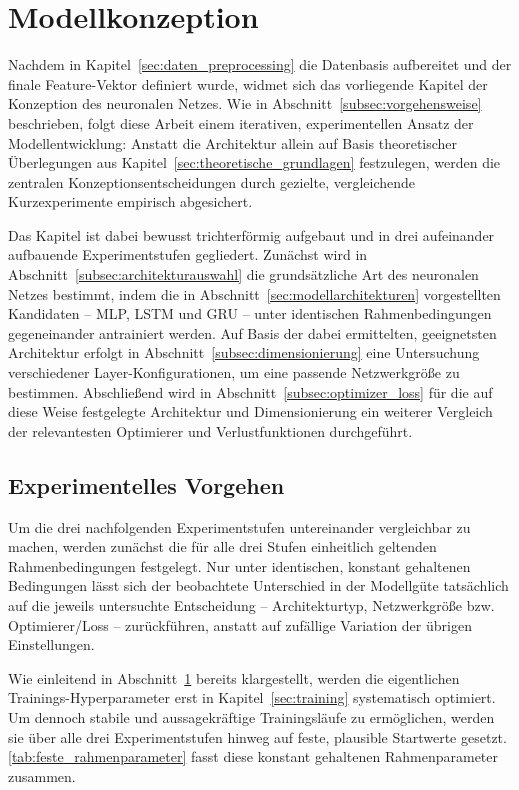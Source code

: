 \section{Modellkonzeption}
\label{sec:konzeption}

Nachdem in Kapitel~\ref{sec:daten_preprocessing} die Datenbasis aufbereitet und der finale Feature-Vektor definiert wurde, widmet sich das vorliegende Kapitel der Konzeption des neuronalen Netzes. Wie in Abschnitt~\ref{subsec:vorgehensweise} beschrieben, folgt diese Arbeit einem iterativen, experimentellen Ansatz der Modellentwicklung: Anstatt die Architektur allein auf Basis theoretischer Überlegungen aus Kapitel~\ref{sec:theoretische_grundlagen} festzulegen, werden die zentralen Konzeptionsentscheidungen durch gezielte, vergleichende Kurzexperimente empirisch abgesichert.

Das Kapitel ist dabei bewusst trichterförmig aufgebaut und in drei aufeinander aufbauende Experimentstufen gegliedert. Zunächst wird in Abschnitt~\ref{subsec:architekturauswahl} die grundsätzliche Art des neuronalen Netzes bestimmt, indem die in Abschnitt~\ref{sec:modellarchitekturen} vorgestellten Kandidaten -- \gls{MLP}, \gls{LSTM} und \gls{GRU} -- unter identischen Rahmenbedingungen gegeneinander antrainiert werden. Auf Basis der dabei ermittelten, geeignetsten Architektur erfolgt in Abschnitt~\ref{subsec:dimensionierung} eine Untersuchung verschiedener Layer-Konfigurationen, um eine passende Netzwerkgröße zu bestimmen. Abschließend wird in Abschnitt~\ref{subsec:optimizer_loss} für die auf diese Weise festgelegte Architektur und Dimensionierung ein weiterer Vergleich der relevantesten Optimierer und Verlustfunktionen durchgeführt.

\subsection{Experimentelles Vorgehen}
\label{subsec:experimentelles_vorgehen}

Um die drei nachfolgenden Experimentstufen untereinander vergleichbar zu machen, werden zunächst die für alle drei Stufen einheitlich geltenden Rahmenbedingungen festgelegt. Nur unter identischen, konstant gehaltenen Bedingungen lässt sich der beobachtete Unterschied in der Modellgüte tatsächlich auf die jeweils untersuchte Entscheidung -- Architekturtyp, Netzwerkgröße bzw. Optimierer/Loss -- zurückführen, anstatt auf zufällige Variation der übrigen Einstellungen.

Wie einleitend in Abschnitt~\ref{sec:konzeption} bereits klargestellt, werden die eigentlichen Trainings-Hyperparameter erst in Kapitel~\ref{sec:training} systematisch optimiert. Um dennoch stabile und aussagekräftige Trainingsläufe zu ermöglichen, werden sie über alle drei Experimentstufen hinweg auf feste, plausible Startwerte gesetzt. \autoref{tab:feste_rahmenparameter} fasst diese konstant gehaltenen Rahmenparameter zusammen.

